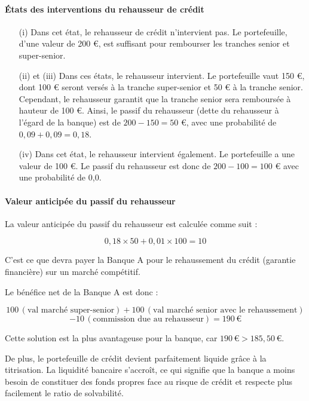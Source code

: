 \documentclass[a4paper, 12pt]{report}
\begin{document}
\paragraph{États des interventions du rehausseur de crédit}

\begin{itemize}
\item[(i)] Dans cet état, le rehausseur de crédit n'intervient pas. Le portefeuille, d'une valeur de 200 €, est suffisant pour rembourser les tranches senior et super-senior.

\item[(ii) et (iii)] Dans ces états, le rehausseur intervient. Le portefeuille vaut 150 €, dont 100 € seront versés à la tranche super-senior et 50 € à la tranche senior. Cependant, le rehausseur garantit que la tranche senior sera remboursée à hauteur de 100 €. Ainsi, le passif du rehausseur (dette du rehausseur à l'égard de la banque) est de \(200 - 150 = 50\) €, avec une probabilité de \(0,09 + 0,09 = 0,18\).

\item[(iv)] Dans cet état, le rehausseur intervient également. Le portefeuille a une valeur de 100 €. Le passif du rehausseur est donc de \(200 - 100 = 100\) € avec une probabilité de 0,0.
\end{itemize}

\paragraph{Valeur anticipée du passif du rehausseur}

La valeur anticipée du passif du rehausseur est calculée comme suit : 

\[
0,18 \times 50 + 0,01 \times 100 = 10
\]

C'est ce que devra payer la Banque A pour le rehaussement du crédit (garantie financière) sur un marché compétitif.

Le bénéfice net de la Banque A est donc :

\[
100 \, (\text{val marché super-senior}) + 100 \, (\text{val marché senior avec le rehaussement})
\]
\[ 
 - 10 \, (\text{commission due au rehausseur}) = 190 \, \text{€}
 \]

Cette solution est la plus avantageuse pour la banque, car \(190 \, \text{€} > 185,50 \, \text{€}\).

De plus, le portefeuille de crédit devient parfaitement liquide grâce à la titrisation. La liquidité bancaire s'accroît, ce qui signifie que la banque a moins besoin de constituer des fonds propres face au risque de crédit et respecte plus facilement le ratio de solvabilité.
\end{document}
